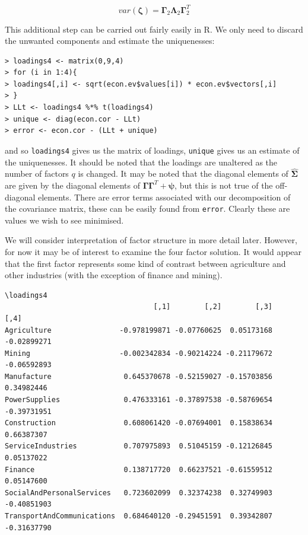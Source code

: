 \begin{displaymath}
var(\boldsymbol{\zeta}) = \boldsymbol{\Gamma}_{2} \boldsymbol{\Lambda}_{2} \boldsymbol{\Gamma}_{2}^{T}
\end{displaymath}


This additional step can be carried out fairly easily in R.   We only need to discard the unwanted components and estimate the uniquenesses:

\singlespacing
\begin{verbatim}
> loadings4 <- matrix(0,9,4)
> for (i in 1:4){
> loadings4[,i] <- sqrt(econ.ev$values[i]) * econ.ev$vectors[,i]
> }
> LLt <- loadings4 %*% t(loadings4)
> unique <- diag(econ.cor - LLt)
> error <- econ.cor - (LLt + unique)
\end{verbatim}
\onehalfspacing

and so \texttt{loadings4} gives us the matrix of loadings, \texttt{unique} gives us an estimate of the uniquenesses.  It should be noted that the loadings are unaltered as the number of factors $q$ is changed.   It may be noted that the diagonal elements of $\boldsymbol{\hat{\Sigma}}$ are given by the diagonal elements of $\boldsymbol{\Gamma}\boldsymbol{\Gamma}^{T} + \boldsymbol{\psi}$, but this is not true of the off-diagonal elements.  There are error terms associated with our decomposition of the covariance matrix, these can be easily found from \texttt{error}.  Clearly these are values we wish to see minimised. 

We will consider interpretation of factor structure in more detail later.   However, for now it may be of interest to examine the four factor solution.   It would appear that the first factor represents some kind of contrast between agriculture and other industries (with the exception of finance and mining).

\singlespacing
\begin{verbatim}
\loadings4
                                   [,1]        [,2]        [,3]        [,4]
Agriculture                -0.978199871 -0.07760625  0.05173168 -0.02899271
Mining                     -0.002342834 -0.90214224 -0.21179672 -0.06592893
Manufacture                 0.645370678 -0.52159027 -0.15703856  0.34982446
PowerSupplies               0.476333161 -0.37897538 -0.58769654 -0.39731951
Construction                0.608061420 -0.07694001  0.15838634  0.66387307
ServiceIndustries           0.707975893  0.51045159 -0.12126845  0.05137022
Finance                     0.138717720  0.66237521 -0.61559512  0.05147600
SocialAndPersonalServices   0.723602099  0.32374238  0.32749903 -0.40851903
TransportAndCommunications  0.684640120 -0.29451591  0.39342807 -0.31637790
\end{verbatim}
\onehalfspacing

